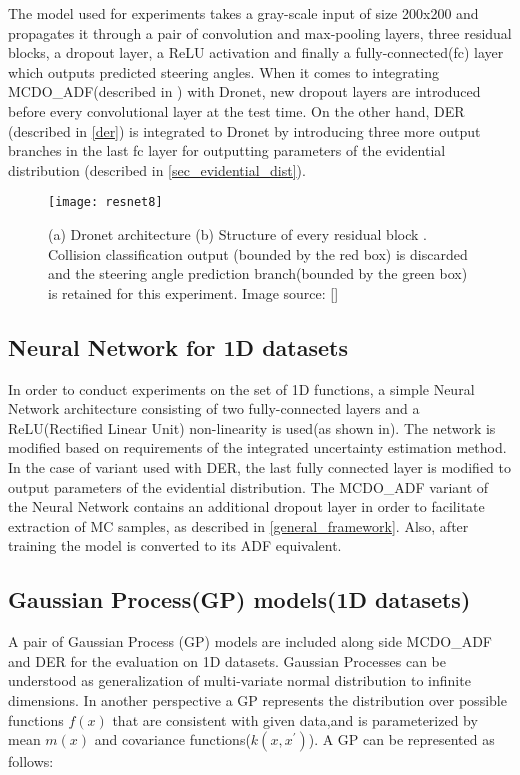 The model used for experiments takes a gray-scale input of size 200x200 and propagates it through a pair of convolution and max-pooling layers, three residual blocks, a dropout layer, a ReLU activation and finally a fully-connected(fc) layer which outputs predicted steering angles. When it comes to integrating MCDO\_ADF(described in \cite{general_framework}) with Dronet, new dropout layers are introduced before every convolutional layer at the test time. On the other hand, DER (described in \ref{der}) is integrated to Dronet by introducing three more output branches in the last fc layer for outputting parameters of the evidential distribution (described in \ref{sec_evidential_dist}).
\begin{figure}
	\texttt{[image: resnet8]}
	\caption{(a) Dronet architecture (b) Structure of every residual block . Collision classification output (bounded by the red box) is discarded and the steering angle prediction branch(bounded by the green box) is retained for this experiment.  Image source: [\cite{loquercio2018dronet}] }
	\label{fig_resnet8}
\end{figure}
\subsection{Neural Network for 1D datasets}\label{1D_net}
In order to conduct experiments on the set of 1D functions, a simple Neural Network architecture consisting of two fully-connected layers and a ReLU(Rectified Linear Unit) non-linearity is used(as shown in). The network is modified based on requirements of the integrated uncertainty estimation method. In the case of variant used with DER, the last fully connected layer is modified to output parameters of the evidential distribution. The MCDO\_ADF variant of the Neural Network contains an additional dropout layer in order to facilitate extraction of MC samples, as described in \ref{general_framework}. Also, after training the model is converted to its ADF equivalent.
\subsection{Gaussian Process(GP) models(1D datasets)}
A pair of Gaussian Process (GP) models are included along side MCDO\_ADF and DER for the evaluation on 1D datasets. Gaussian Processes can be understood as generalization of multi-variate normal distribution to infinite dimensions. In another perspective a GP represents the distribution over possible functions $f(x)$ that are consistent with given data,and is parameterized by mean $m(x)$ and covariance functions($k(x, x^\prime)$). A GP can be represented as follows:

